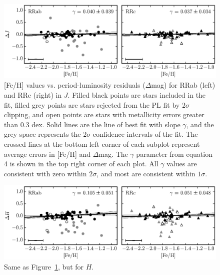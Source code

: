 \documentclass[a4paper,fleqn,usenatbib]{mnras}
\begin{document}

\begin{figure}
\begin{center}
\includegraphics[width=160mm]{../ocen_only_fitting/final_plots/metallicity_vs_residuals_J_sigclip.eps}
\caption{[Fe/H] values \citep{2016arXiv160904916B} vs. period-luminosity residuals ($\Delta$mag) for RRab (left) and RRc (right) in $J$. Filled black points are stars included in the fit, filled grey points are stars rejected from the PL fit by $2\sigma$ clipping, and open points are stars with metallicity errors greater than 0.3 dex. Solid lines are the line of best fit with slope $\gamma$, and the grey space represents the $2\sigma$ confidence intervals of the fit. The crossed lines at the bottom left corner of each subplot represent average errors in [Fe/H] and $\Delta$mag. The $\gamma$ parameter from equation 4 is shown in the top right corner of each plot. All $\gamma$ values are consistent with zero within $2\sigma$, and most are consistent within $1\sigma$.}
\label{fig:metallicity_residuals_j}
\end{center}
\end{figure}

\begin{figure}
\begin{center}
\includegraphics[width=160mm]{../ocen_only_fitting/final_plots/metallicity_vs_residuals_H_sigclip.eps}
\caption{Same as Figure~\ref{fig:metallicity_residuals_j}, but for $H$.}
\label{fig:metallicity_residuals_h}
\end{center}
\end{figure}
\end{document}
